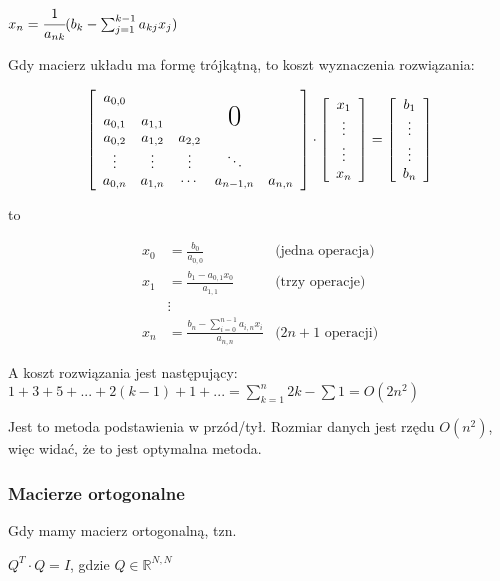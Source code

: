 \documentclass[hidelinks,a4paper,fleqn]{article}
\newcommand{\RR}{\mathbb{R}}
\begin{document}
$x_n = \cfrac{1}{a_{nk}}(b_k - \sum_{j=1}^{k-1} a_{kj}x_j)$

Gdy macierz układu ma formę trójkątną, to koszt wyznaczenia rozwiązania:

\[
	\left[
		\begin{array}{ccccc}
			a_{0,0} \\
			a_{0,1} & a_{1,1}  &   & \text{\huge0}\\
			a_{0,2}  & a_{1,2} & a_{2,2} \\
			\vdots  & \vdots & \vdots & \ddots \\
			a_{0,n} & a_{1,n} & \cdots & a_{n-1,n} & a_{n,n} 
		\end{array}
	\right]
	\cdot
	\left [
		\begin{array}{c}
			x_1 \\  \vdots \\  \vdots \\ x_n
		\end{array}
	\right]
	=
	\left [
		\begin{array}{c}
			b_1 \\ \vdots \\ \vdots \\ b_n
		\end{array}
	\right]
\]

to

\begin{align*}
	x_0 & = \frac{b_0}{a_{0,0}}                                & \text{(jedna operacja)}    \\
	x_1 & = \frac{b_1 - a_{0,1} x_0}{a_{1,1}}                  & \text{(trzy operacje)}     \\
	&\vdots \\
	x_n & = \frac{b_n - \sum_{i=0}^{n-1} a_{i,n} x_i}{a_{n,n}} & \text{($2n + 1$ operacji)} 
\end{align*}

A koszt rozwiązania jest następujący:
$1+3+5+...+2(k-1)+1+... = \sum_{k=1}^{n} 2k - \sum 1 = O(2n^2)$

Jest to metoda podstawienia w przód/tył. Rozmiar danych jest rzędu $O(n^2)$, więc widać, że to jest optymalna metoda.

\subsubsection{Macierze ortogonalne}

Gdy mamy macierz ortogonalną, tzn.

$Q^T \cdot Q = I$, gdzie $Q \in \RR^{N, N}$
\end{document}
